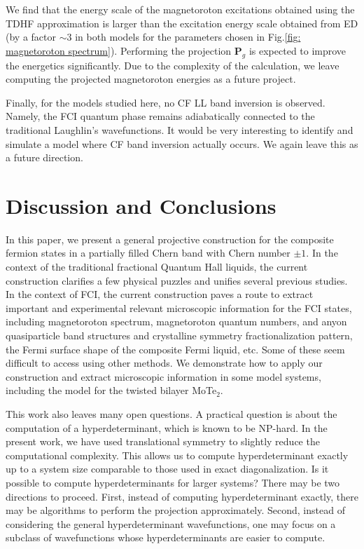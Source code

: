 We find that the energy scale of the magnetoroton excitations obtained using the TDHF approximation is larger than the excitation energy scale obtained from ED (by a factor $\sim 3$ in both models for the parameters chosen in Fig.\ref{fig: magnetoroton spectrum}). Performing the projection $\mathbf P_g$ is expected to improve the energetics significantly. Due to the complexity of the calculation, we leave computing the projected magnetoroton energies as a future project.

Finally, for the models studied here, no CF LL band inversion is observed. Namely, the FCI quantum phase remains adiabatically connected to the traditional Laughlin's wavefunctions. It would be very interesting to identify and simulate a model where CF band inversion actually occurs. We again leave this as a future direction.

\section{Discussion and Conclusions}\label{sec:conclusion}
In this paper, we present a general projective construction for the composite fermion states in a partially filled Chern band with Chern number $\pm 1$. In the context of the traditional fractional Quantum Hall liquids, the current construction clarifies a few physical puzzles and unifies several previous studies. In the context of FCI, the current construction paves a route to extract important and experimental relevant microscopic information for the FCI states, including magnetoroton spectrum, magnetoroton quantum numbers, and anyon quasiparticle band structures and  crystalline symmetry fractionalization pattern, the Fermi surface shape of the composite Fermi liquid, etc. Some of these seem difficult to access using other methods. We demonstrate how to apply our construction and extract microscopic information in some model systems, including the model for the twisted bilayer MoTe$_2$.

This work also leaves many open questions. A practical question is about the computation of a hyperdeterminant, which is known to be NP-hard. In the present work, we have used translational symmetry to slightly reduce the computational complexity. This allows us to compute hyperdeterminant exactly up to a system size comparable to those used in exact diagonalization. Is it possible to compute hyperdeterminants for larger systems? There may be two directions to proceed. First, instead of computing hyperdeterminant exactly, there may be algorithms to perform the projection approximately. Second, instead of considering the general hyperdeterminant wavefunctions, one may focus on a subclass of wavefunctions whose hyperdeterminants are easier to compute. 


